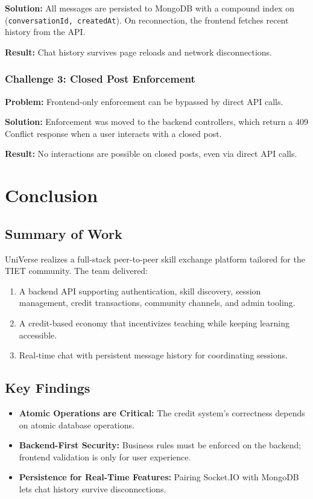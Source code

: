 \documentclass{tietreport}
\begin{document}
\textbf{Solution:} All messages are persisted to MongoDB with a compound index on (\texttt{conversationId, createdAt}). On reconnection, the frontend fetches recent history from the API.

\textbf{Result:} Chat history survives page reloads and network disconnections.

\subsection{Challenge 3: Closed Post Enforcement}

\textbf{Problem:} Frontend-only enforcement can be bypassed by direct API calls.

\textbf{Solution:} Enforcement was moved to the backend controllers, which return a 409 Conflict response when a user interacts with a closed post.

\textbf{Result:} No interactions are possible on closed posts, even via direct API calls.

\chapter{Conclusion}

\section{Summary of Work}

UniVerse realizes a full-stack peer-to-peer skill exchange platform tailored for the TIET community. The team delivered:

\begin{enumerate}
  \item A backend API supporting authentication, skill discovery, session management, credit transactions, community channels, and admin tooling.
  \item A credit-based economy that incentivizes teaching while keeping learning accessible.
  \item Real-time chat with persistent message history for coordinating sessions.
\end{enumerate}

\section{Key Findings}

\begin{itemize}
  \item \textbf{Atomic Operations are Critical:} The credit system's correctness depends on atomic database operations.
  \item \textbf{Backend-First Security:} Business rules must be enforced on the backend; frontend validation is only for user experience.
  \item \textbf{Persistence for Real-Time Features:} Pairing Socket.IO with MongoDB lets chat history survive disconnections.
\end{itemize}
\end{document}
